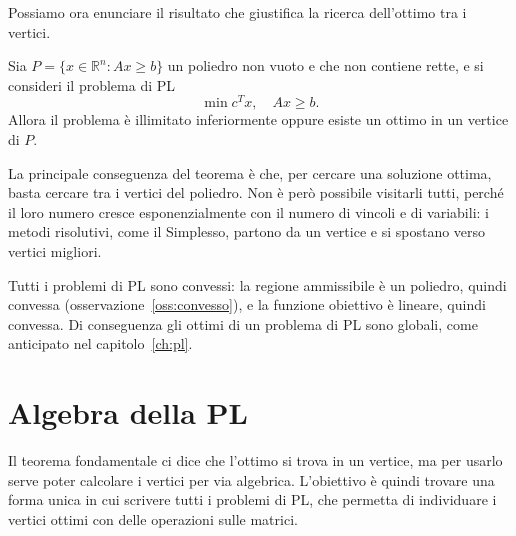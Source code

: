 Possiamo ora enunciare il risultato che giustifica la ricerca dell'ottimo tra i vertici.

\begin{teorema}\label{teo:fondamentale}
Sia $P = \{x \in \mathbb{R}^n : A x \ge b\}$ un poliedro non vuoto e che non contiene rette, e si consideri il problema di PL
\[
\min c^T x, \quad A x \ge b.
\]
Allora il problema è illimitato inferiormente oppure esiste un ottimo in un vertice di $P$.
\end{teorema}

La principale conseguenza del teorema è che, per cercare una soluzione ottima, basta cercare tra i vertici del poliedro. Non è però possibile visitarli tutti, perché il loro numero cresce esponenzialmente con il numero di vincoli e di variabili: i metodi risolutivi, come il Simplesso, partono da un vertice e si spostano verso vertici migliori.

\begin{osservazione}\label{oss:globali}
Tutti i problemi di PL sono convessi: la regione ammissibile è un poliedro, quindi convessa (osservazione~\ref{oss:convesso}), e la funzione obiettivo è lineare, quindi convessa. Di conseguenza gli ottimi di un problema di PL sono globali, come anticipato nel capitolo~\ref{ch:pl}.
\end{osservazione}

\section{Algebra della PL}
Il teorema fondamentale ci dice che l'ottimo si trova in un vertice, ma per usarlo serve poter calcolare i vertici per via algebrica. L'obiettivo è quindi trovare una forma unica in cui scrivere tutti i problemi di PL, che permetta di individuare i vertici ottimi con delle operazioni sulle matrici.

